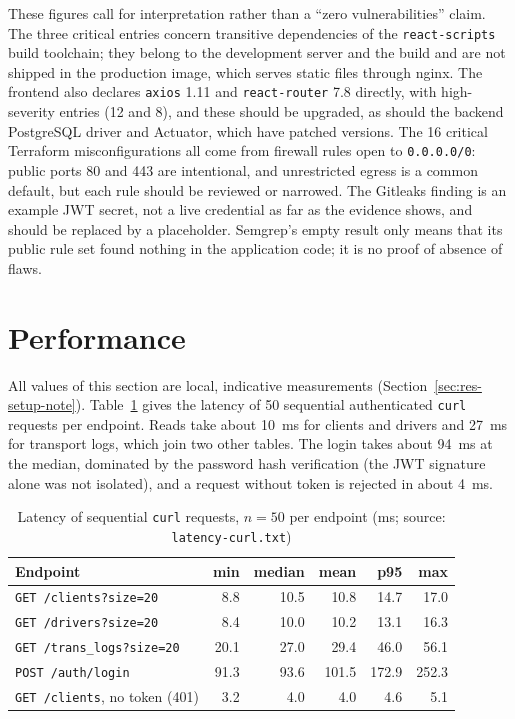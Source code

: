 These figures call for interpretation rather than a ``zero vulnerabilities'' claim. The three critical entries concern transitive dependencies of the \texttt{react-scripts} build toolchain; they belong to the development server and the build and are not shipped in the production image, which serves static files through nginx. The frontend also declares \texttt{axios} 1.11 and \texttt{react-router} 7.8 directly, with high-severity entries (12 and 8), and these should be upgraded, as should the backend PostgreSQL driver and Actuator, which have patched versions. The 16 critical Terraform misconfigurations all come from firewall rules open to \texttt{0.0.0.0/0}: public ports 80 and 443 are intentional, and unrestricted egress is a common default, but each rule should be reviewed or narrowed. The Gitleaks finding is an example JWT secret, not a live credential as far as the evidence shows, and should be replaced by a placeholder. Semgrep's empty result only means that its public rule set found nothing in the application code; it is no proof of absence of flaws.

\section{Performance}\label{sec:res-perf}

All values of this section are local, indicative measurements (Section~\ref{sec:res-setup-note}). Table~\ref{tab:latency} gives the latency of 50 sequential authenticated \texttt{curl} requests per endpoint. Reads take about 10~ms for clients and drivers and 27~ms for transport logs, which join two other tables. The login takes about 94~ms at the median, dominated by the password hash verification (the JWT signature alone was not isolated), and a request without token is rejected in about 4~ms.

\begin{table}[H]
\centering\small
\caption{Latency of sequential \texttt{curl} requests, $n=50$ per endpoint (ms; source: \texttt{latency-curl.txt})}\label{tab:latency}
\begin{tabularx}{\linewidth}{@{}Xrrrrr@{}}
\toprule
\textbf{Endpoint} & \textbf{min} & \textbf{median} & \textbf{mean} & \textbf{p95} & \textbf{max} \\
\midrule
\texttt{GET /clients?size=20} & 8.8 & 10.5 & 10.8 & 14.7 & 17.0 \\
\texttt{GET /drivers?size=20} & 8.4 & 10.0 & 10.2 & 13.1 & 16.3 \\
\texttt{GET /trans\_logs?size=20} & 20.1 & 27.0 & 29.4 & 46.0 & 56.1 \\
\texttt{POST /auth/login} & 91.3 & 93.6 & 101.5 & 172.9 & 252.3 \\
\texttt{GET /clients}, no token (401) & 3.2 & 4.0 & 4.0 & 4.6 & 5.1 \\
\bottomrule
\end{tabularx}
\end{table}

